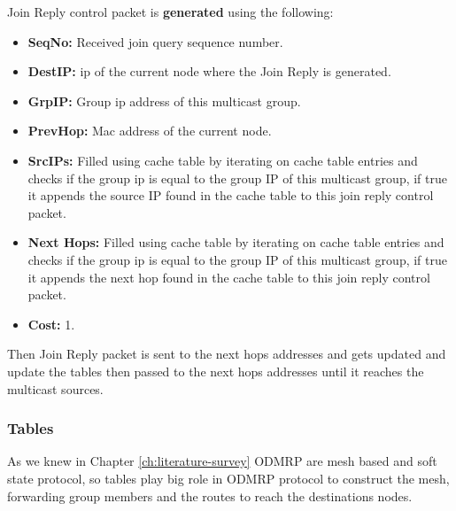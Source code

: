 Join Reply control packet is \textbf{generated} using the following:
\begin{itemize}[itemsep=1pt, topsep=5pt]
    \item \textbf{SeqNo:} Received join query sequence number.
    \item \textbf{DestIP:} \acrshort{ip} of the current node where the Join Reply is generated.
    \item \textbf{GrpIP:} Group \acrshort{ip} address of this multicast group.
    \item \textbf{PrevHop:} Mac address of the current node.
    \item \textbf{SrcIPs:} Filled using cache table by iterating on cache table entries and checks if the group \acrshort{ip} is equal to the group IP of this multicast group, if true it appends the source IP found in the cache table to this join reply control packet.
    \item \textbf{Next Hops:} Filled using cache table by iterating on cache table entries and checks if the group \acrshort{ip} is equal to the group IP of this multicast group, if true it appends the next hop found in the cache table to this join reply control packet.
    \item \textbf{Cost:} 1.
\end{itemize}

Then Join Reply packet is sent to the next hops addresses and gets updated and update the tables then passed to the next hops addresses until it reaches the multicast sources.

\subsubsection{Tables}
As we knew in Chapter \ref{ch:literature-survey} ODMRP are mesh based and soft state protocol, so tables play big role in ODMRP protocol to construct the mesh, forwarding group members and the routes to reach the destinations nodes.

